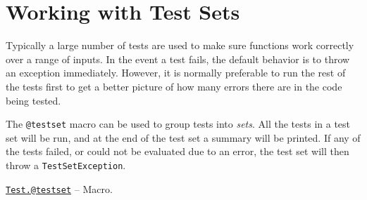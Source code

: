 \hypertarget{12305239832165996459}{}


\section{Working with Test Sets}



Typically a large number of tests are used to make sure functions work correctly over a range of inputs. In the event a test fails, the default behavior is to throw an exception immediately. However, it is normally preferable to run the rest of the tests first to get a better picture of how many errors there are in the code being tested.



The \texttt{@testset} macro can be used to group tests into \emph{sets}. All the tests in a test set will be run, and at the end of the test set a summary will be printed. If any of the tests failed, or could not be evaluated due to an error, the test set will then throw a \texttt{TestSetException}.


\hypertarget{6603917731228482697}{} 
\hyperlink{6603917731228482697}{\texttt{Test.@testset}}  -- {Macro.}

